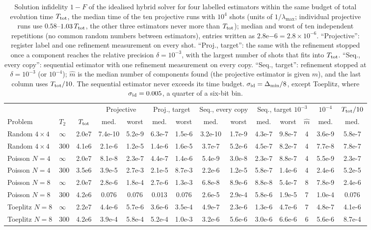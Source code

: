 \documentclass[journal]{IEEEtran}
\newcommand{\lmax}{\lambda_{\max}}
\begin{document}
\begin{table}[t]
\caption{Solution infidelity $1-F$ of the idealised hybrid solver for four labelled estimators within the same budget of total evolution time $T_{\rm tot}$, the median time of the ten projective runs with $10^4$ shots (units of $1/\lmax$; individual projective runs use $0.58$--$1.03\,T_{\rm tot}$, the other three estimators never more than $T_{\rm tot}$); median and worst of ten independent repetitions (no common random numbers between estimators), entries written as $2.8\mathrm{e}{-6}=2.8\times10^{-6}$. ``Projective'': register label and one refinement measurement on every shot. ``Proj., target'': the same with the refinement stopped once a component reaches the relative precision $\delta=10^{-3}$, with the largest number of shots that fits into $T_{\rm tot}$. ``Seq., every copy'': sequential estimator with one refinement measurement on every copy. ``Seq., target'': refinement stopped at $\delta=10^{-3}$ (or $10^{-4}$); $\hat m$ is the median number of components found (the projective estimator is given $m$), and the last column uses $T_{\rm tot}/10$. The sequential estimator never exceeds its time budget. $\sigma_{\rm id}=\Delta_{\min}/8$, except Toeplitz, where $\sigma_{\rm id}=0.005$, a quarter of a six-bit bin.}
\label{tab:matched}
\centering\footnotesize
\begin{tabular}{llcccccccccccc}
\toprule
 & & & \multicolumn{2}{c}{Projective} & \multicolumn{2}{c}{Proj., target} & \multicolumn{2}{c}{Seq., every copy} & \multicolumn{3}{c}{Seq., target $10^{-3}$} & $10^{-4}$ & $T_{\rm tot}/10$\\
Problem & $T_2$ & $T_{\rm tot}$ & med. & worst & med. & worst & med. & worst & med. & worst & $\hat m$ & med. & med.\\
\midrule
Random $4\times4$ & $\infty$ & 2.0e7 & 7.4e-10 & 5.2e-9 & 6.3e-7 & 1.5e-6 & 3.2e-10 & 1.7e-9 & 4.3e-7 & 9.8e-7 & 4 & 3.6e-9 & 5.8e-7\\
Random $4\times4$ & 300 & 4.1e6 & 2.1e-6 & 1.2e-5 & 1.4e-6 & 1.6e-5 & 3.7e-7 & 5.2e-6 & 4.5e-7 & 8.2e-7 & 4 & 7.7e-8 & 7.8e-7\\
Poisson $N=4$ & $\infty$ & 2.0e7 & 8.1e-8 & 2.3e-7 & 4.4e-7 & 1.4e-6 & 5.4e-9 & 3.0e-8 & 2.3e-7 & 8.8e-7 & 4 & 5.5e-9 & 2.3e-7\\
Poisson $N=4$ & 300 & 3.5e6 & 3.9e-5 & 2.7e-3 & 2.1e-5 & 8.7e-3 & 2.2e-6 & 1.2e-5 & 5.8e-7 & 1.4e-6 & 4 & 2.4e-6 & 5.2e-5\\
Poisson $N=8$ & $\infty$ & 2.0e7 & 2.8e-6 & 1.8e-4 & 2.7e-6 & 1.3e-3 & 6.8e-8 & 8.9e-6 & 8.8e-8 & 5.4e-7 & 8 & 7.8e-9 & 2.4e-6\\
Poisson $N=8$ & 300 & 4.2e6 & 0.076 & 0.076 & 0.013 & 0.076 & 2.6e-5 & 2.9e-4 & 5.8e-6 & 1.9e-5 & 7 & 1.0e-4 & 0.076\\
Toeplitz $N=8$ & $\infty$ & 2.2e7 & 4.4e-6 & 5.7e-6 & 3.6e-6 & 3.5e-4 & 4.9e-7 & 2.3e-6 & 1.3e-6 & 4.7e-6 & 7 & 4.8e-7 & 4.1e-6\\
Toeplitz $N=8$ & 300 & 4.2e6 & 3.9e-4 & 5.8e-4 & 5.2e-4 & 1.0e-3 & 3.2e-6 & 5.6e-6 & 3.0e-6 & 6.6e-6 & 6 & 5.6e-6 & 8.7e-4\\
\bottomrule
\end{tabular}
\end{table}
\end{document}

